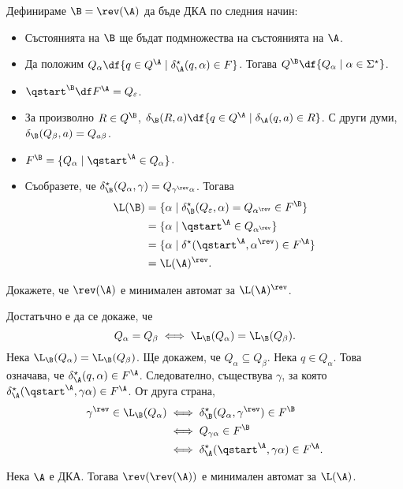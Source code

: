 Дефинираме $\B = \rev(\A)$ да бъде ДКА по следния начин:
\begin{itemize}
\item
  Състоянията на $\B$ ще бъдат подмножества на състоянията на $\A$.

\item
  Да положим $Q_\alpha \df \{q \in Q^\A \mid \delta^\star_\A(q,\alpha) \in F\}$.
  Тогава
  $Q^\B \df \{Q_\alpha \mid \alpha \in \Sigma^{\star}\}$.
\item
  $\qstart^\B \df F^\A = Q_\varepsilon$.
\item
  За произволно $R \in Q^\B$,
  $\delta_\B(R,a) \df \{q \in Q^\A \mid \delta_\A(q,a) \in R\}$.
  С други думи,
  $\delta_\B(Q_\beta,a) = Q_{a\beta}$.
\item
  $F^\B = \{Q_\alpha \mid \qstart^\A \in Q_\alpha\}$.
\item
  Съобразете, че $\delta^\star_\B(Q_\alpha,\gamma) = Q_{\gamma^\rev\alpha}$.
  Тогава
  \begin{align*}
    \L(\B) & = \{\alpha \mid \delta^\star_\B(Q_\varepsilon,\alpha) = Q_{\alpha^\rev} \in F^\B\}\\
           & = \{\alpha \mid  \qstart^\A \in Q_{\alpha^\rev}\}\\
           & = \{\alpha \mid  \delta^\star(\qstart^\A,\alpha^\rev) \in F^\A\}\\
           & = \L(\A)^\rev.
  \end{align*}
\end{itemize}

\begin{problem}
  Докажете, че $\rev(\A)$ е минимален автомат за $\L(\A)^\rev$.
\end{problem}
\begin{hint}
  Достатъчно е да се докаже, че
  \[Q_\alpha = Q_\beta \iff \L_\B(Q_\alpha) = \L_\B(Q_\beta).\]
  Нека $\L_\B(Q_\alpha) = \L_\B(Q_\beta)$. Ще докажем, че $Q_\alpha \subseteq Q_\beta$.
  Нека $q \in Q_\alpha$. Това означава, че $\delta^\star_\A(q,\alpha) \in F^\A$.
  Следователно, съществува $\gamma$, за която $\delta^\star_\A(\qstart^\A,\gamma\alpha) \in F^\A$.
  От друга страна,
  \begin{align*}
    \gamma^\rev \in \L_\B(Q_\alpha) & \iff \delta^\star_\B(Q_\alpha,\gamma^\rev) \in F^\B\\
                                    & \iff Q_{\gamma\alpha} \in F^\B\\
                                    & \iff \delta^\star_\A(\qstart^\A,\gamma\alpha) \in F^\A.
  \end{align*}
\end{hint}


\begin{framed}
  \begin{theorem}[Бжозовски]
    Нека $\A$ е ДКА. Тогава $\rev(\rev(\A))$ е минимален автомат за $\L(\A)$.
  \end{theorem}
\end{framed}


